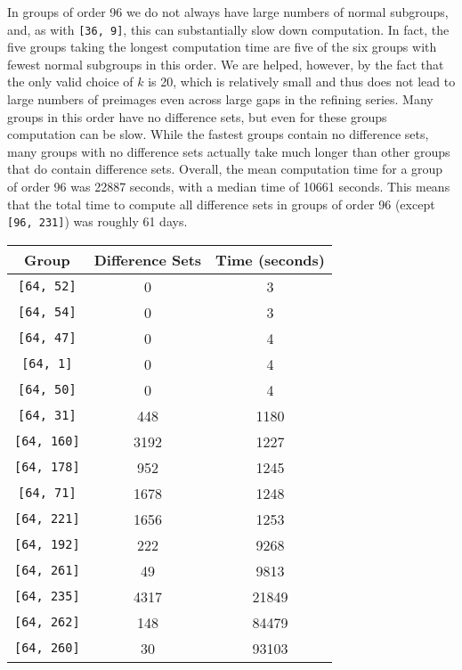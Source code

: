 \documentclass[a4paper,11pt]{report}
\begin{document}
{{ In groups of order 96 we do not always have large numbers of normal subgroups,
and, as with \texttt{[36, 9]}, this can substantially slow down computation. In fact, the five groups
taking the longest computation time are five of the six groups with fewest
normal subgroups in this order. We are helped, however, by the fact that the
only valid choice of $k$ is 20, which is relatively small and thus does not lead to large numbers of
preimages even across large gaps in the refining series. Many groups in this
order have no difference sets, but even for these groups computation can be
slow. While the fastest groups contain no difference sets, many groups with no
difference sets actually take much longer than other groups that do contain
difference sets. Overall, the mean computation time for a group of order 96
was 22887 seconds, with a median time of 10661 seconds. This means that the
total time to compute all difference sets in groups of order 96 (except \texttt{[96, 231]}) was roughly 61 days. 

 \begin{center}
\begin{tabular}{ccc}Group&
Difference Sets&
Time (seconds)\\
\hline
\texttt{[64, 52]}&
0&
3\\
\texttt{[64, 54]}&
0&
3\\
\texttt{[64, 47]}&
0&
4\\
\texttt{[64, 1]}&
0&
4\\
\texttt{[64, 50]}&
0&
4\\
\texttt{[64, 31]}&
448&
1180\\
\texttt{[64, 160]}&
3192&
1227\\
\texttt{[64, 178]}&
952&
1245\\
\texttt{[64, 71]}&
1678&
1248\\
\texttt{[64, 221]}&
1656&
1253\\
\texttt{[64, 192]}&
222&
9268\\
\texttt{[64, 261]}&
49&
9813\\
\texttt{[64, 235]}&
4317&
21849\\
\texttt{[64, 262]}&
148&
84479\\
\texttt{[64, 260]}&
30&
93103\\
\end{tabular}\\[2mm]
\end{center}

}}
\end{document}
